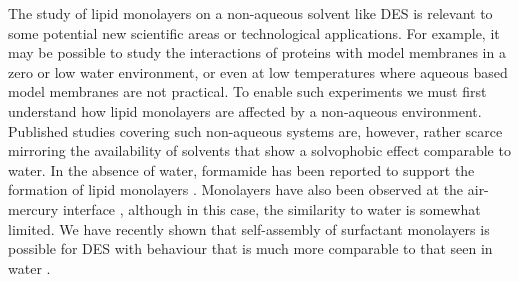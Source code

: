 \documentclass[amsmath,amssymb,twocolumn,superscriptaddress]{revtex4-1}
\begin{document}
The study of lipid monolayers on a non-aqueous solvent like DES is relevant to some potential new scientific areas or technological applications.
For example, it may be possible to study the interactions of proteins with model membranes in a zero or low water environment, or even at low temperatures where aqueous based model membranes are not practical.
To enable such experiments we must first understand how lipid monolayers are affected by a non-aqueous environment.
Published studies covering such non-aqueous systems are, however, rather scarce mirroring the availability of solvents that show a solvophobic effect comparable to water.
In the absence of water, formamide has been reported to support the formation of lipid monolayers \cite{graner_phospholipidic_1995, weinbach_self-assembled_1993}.
Monolayers have also been observed at the air-mercury interface \cite{magnussen_self-assembly_1996, kraack_structure_2002}, although in this case, the similarity to water is somewhat limited.
We have recently shown that self-assembly of surfactant monolayers is possible for DES with behaviour that is much more comparable to that seen in water \cite{arnold_surfactant_2015, sanchez-fernandez_self-assembly_2018}.
\end{document}

